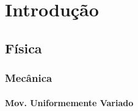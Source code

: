 \chapter{Introdução}
\section{Física}
\subsection{Mecânica}
\subsubsection{Mov. Uniformemente Variado}

\blindmathpaper